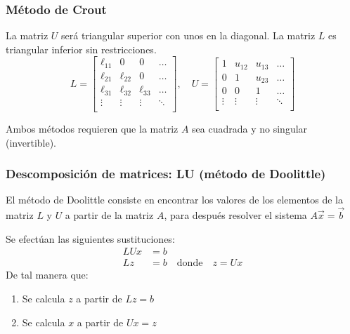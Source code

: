 \subsubsection{Método de Crout}

La matriz \(U\) será triangular superior con unos en la diagonal.
La matriz \(L\) es triangular inferior sin restricciones.
\[
L = \begin{bmatrix}
\ell_{11} & 0 & 0 & \dots \\
\ell_{21} & \ell_{22} & 0 & \dots \\
\ell_{31} & \ell_{32} & \ell_{33} & \dots \\
\vdots & \vdots & \vdots & \ddots \\
\end{bmatrix},
\quad
U = \begin{bmatrix}
1 & u_{12} & u_{13} & \dots \\
0 & 1 & u_{23} & \dots \\
0 & 0 & 1 & \dots \\
\vdots & \vdots & \vdots & \ddots \\
\end{bmatrix}
\]

Ambos métodos requieren que la matriz \(A\) sea cuadrada y no singular (invertible).

\subsubsection{Descomposición de matrices: LU (método de Doolittle)}

El método de Doolittle consiste en encontrar los valores de los elementos de la matriz \(L\) y \(U\) a partir de la matriz \(A\), para después resolver el sistema \(A\vec{x} = \vec{b}\)

Se efectúan las siguientes sustituciones:
\begin{align*}
  LUx &= b \\
  Lz &= b \quad \text{donde} \quad z=Ux
\end{align*}
De tal manera que:
\begin{enumerate}
  \item Se calcula \(z\) a partir de \(Lz=b\)
  \item Se calcula \(x\) a partir de \(Ux=z\)
\end{enumerate}


